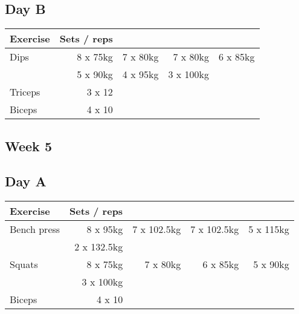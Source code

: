 \documentclass[12pt, a4paper]{article}%
\begin{document}
  \subsection*{\hspace{0.5em} Day B }


  \begin{tabular}{l|rrrr}
  \hspace{0.75em} \textbf{Exercise} & \textbf{Sets / reps} \\ \hline

            \hspace{0.75em} Dips
            & 8 x 75kg
            & 7 x 80kg
            & 7 x 80kg
            & 6 x 85kg
            \\


            \hspace{0.75em}
            & 5 x 90kg
            & 4 x 95kg
            & 3 x 100kg
            & 
            \\


   \hspace{0.75em} Triceps & 3 x 12 \\
   \hspace{0.75em} Biceps & 4 x 10 \\
  \end{tabular}

 \subsection*{\hspace{0.25em} Week 5 }
  \subsection*{\hspace{0.5em} Day A }


  \begin{tabular}{l|rrrr}
  \hspace{0.75em} \textbf{Exercise} & \textbf{Sets / reps} \\ \hline

            \hspace{0.75em} Bench press
            & 8 x 95kg
            & 7 x 102.5kg
            & 7 x 102.5kg
            & 5 x 115kg
            \\


            \hspace{0.75em}
            & 2 x 132.5kg
            & 
            & 
            & 
            \\


            \hspace{0.75em} Squats
            & 8 x 75kg
            & 7 x 80kg
            & 6 x 85kg
            & 5 x 90kg
            \\


            \hspace{0.75em}
            & 3 x 100kg
            & 
            & 
            & 
            \\


   \hspace{0.75em} Biceps & 4 x 10 \\
  \end{tabular}
\end{document}
